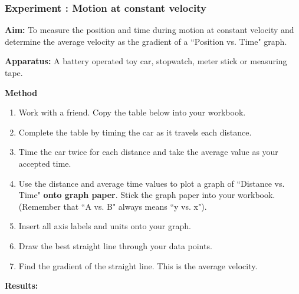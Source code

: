             \subsubsection{ Experiment : Motion at constant velocity }
            \nopagebreak
            \label{m38795*id71268}\noindent{}\textbf{Aim:}
To measure the position and time during motion at constant velocity and determine the average velocity as the gradient of a ``Position vs. Time" graph.\par 
        \label{m38795*id71286}\noindent{}\textbf{Apparatus:}
 A battery operated toy car, stopwatch, meter stick or measuring tape.\par 
        \label{m38795*id71301}\noindent{}\textbf{Method}
        \label{m38795*id71310}\begin{enumerate}[noitemsep, label=\textbf{\arabic*}. ] 
            \label{m38795*uid101}\item Work with a friend. Copy the table below into your workbook.
\label{m38795*uid102}\item Complete the table by timing the car as it travels each distance.
\label{m38795*uid103}\item Time the car twice for each distance and take the average value as your accepted time.
\label{m38795*uid104}\item Use the distance and average time values to plot a graph of ``Distance vs. Time" \textbf{onto graph paper}. Stick the graph paper into your workbook. (Remember that ``A vs. B" always means ``y vs. x").
\label{m38795*uid105}\item Insert all axis labels and units onto your graph.
\label{m38795*uid106}\item Draw the best straight line through your data points.
\label{m38795*uid107}\item Find the gradient of the straight line. This is the average velocity.
\end{enumerate}
        \par 
        \label{m38795*id71410}\noindent{}\textbf{Results:}
